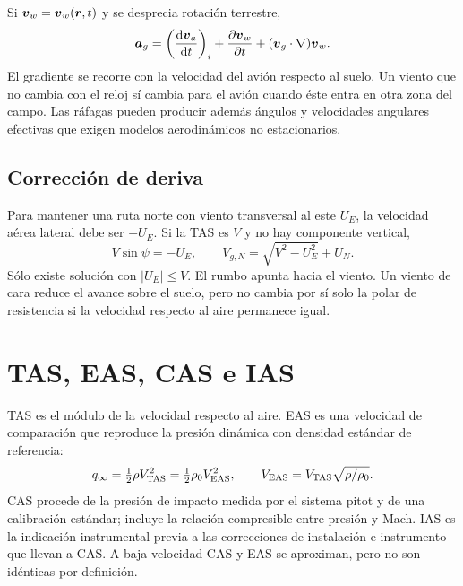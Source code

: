 Si $\boldsymbol{v}_w=\boldsymbol{v}_w(\boldsymbol{r},t)$ y se desprecia rotación terrestre,
\begin{equation}
\boldsymbol{a}_g=\left(\frac{\mathrm{d}\boldsymbol{v}_a}{\mathrm{d} t}\right)_i
+\frac{\partial\boldsymbol{v}_w}{\partial t}
+(\boldsymbol{v}_g\cdot\nabla)\boldsymbol{v}_w.
\end{equation}
El gradiente se recorre con la velocidad del avión respecto al suelo. Un viento que no cambia con el reloj sí cambia para el avión cuando éste entra en otra zona del campo. Las ráfagas pueden producir además ángulos y velocidades angulares efectivas que exigen modelos aerodinámicos no estacionarios.

\subsection{Corrección de deriva}
Para mantener una ruta norte con viento transversal al este $U_E$, la velocidad aérea lateral debe ser $-U_E$. Si la TAS es $V$ y no hay componente vertical,
\begin{equation}
V\sin\psi=-U_E,\qquad V_{g,N}=\sqrt{V^2-U_E^2}+U_N.
\end{equation}
Sólo existe solución con $|U_E|\leq V$. El rumbo apunta hacia el viento. Un viento de cara reduce el avance sobre el suelo, pero no cambia por sí solo la polar de resistencia si la velocidad respecto al aire permanece igual.


\section{TAS, EAS, CAS e IAS}
TAS es el módulo de la velocidad respecto al aire. EAS es una velocidad de comparación que reproduce la presión dinámica con densidad estándar de referencia:
\begin{equation}
q_\infty=\tfrac12\rho V_{\rm TAS}^2
=\tfrac12\rho_0 V_{\rm EAS}^2,\qquad
V_{\rm EAS}=V_{\rm TAS}\sqrt{\rho/\rho_0}.
\end{equation}
CAS procede de la presión de impacto medida por el sistema pitot y de una calibración estándar; incluye la relación compresible entre presión y Mach. IAS es la indicación instrumental previa a las correcciones de instalación e instrumento que llevan a CAS. A baja velocidad CAS y EAS se aproximan, pero no son idénticas por definición.

